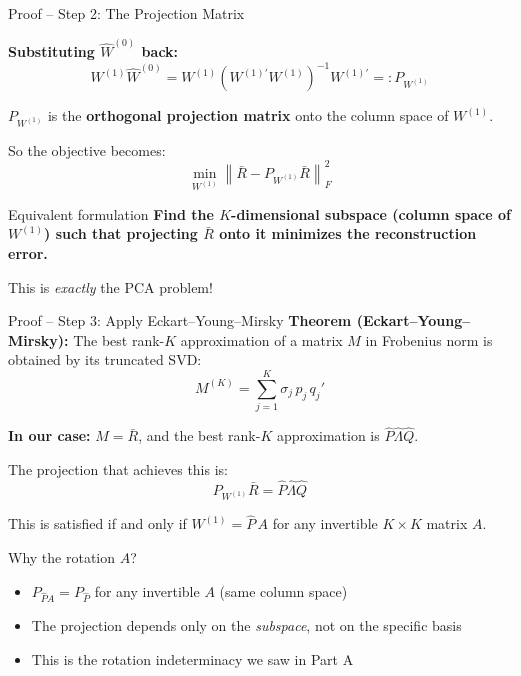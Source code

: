 \documentclass[aspectratio=169]{beamer}
\begin{document}
%
%
\begin{frame}{Proof -- Step 2: The Projection Matrix}

\textbf{Substituting $\hat{W}^{(0)}$ back:}
\[
W^{(1)}\hat{W}^{(0)} = W^{(1)}\left(W^{(1)\prime}W^{(1)}\right)^{-1}W^{(1)\prime} =: P_{W^{(1)}}
\]

$P_{W^{(1)}}$ is the \textbf{orthogonal projection matrix} onto the column space of $W^{(1)}$.

\vspace{0.5em}
So the objective becomes:
\[
\min_{W^{(1)}} \left\| \bar{R} - P_{W^{(1)}}\bar{R} \right\|_F^2
\]

\vspace{0.5em}
\begin{alertblock}{Equivalent formulation}
\textbf{Find the $K$-dimensional subspace (column space of $W^{(1)}$) such that projecting $\bar{R}$ onto it minimizes the reconstruction error.}
\end{alertblock}

This is \emph{exactly} the PCA problem!
\end{frame}
%
%
\begin{frame}{Proof -- Step 3: Apply Eckart--Young--Mirsky}
\small
\textbf{Theorem (Eckart--Young--Mirsky):} The best rank-$K$ approximation of a matrix $M$ in Frobenius norm is obtained by its truncated SVD:
\[
M^{(K)} = \sum_{j=1}^{K} \sigma_j\, p_j\, q_j'
\]

\vspace{0.3em}
\textbf{In our case:} $M = \bar{R}$, and the best rank-$K$ approximation is $\hat{P}\hat{\Lambda}\hat{Q}$.

\vspace{0.5em}
The projection that achieves this is:
\[
P_{W^{(1)}}\bar{R} = \hat{P}\hat{\Lambda}\hat{Q}
\]

This is satisfied if and only if $W^{(1)} = \hat{P}\,A$ for any invertible $K \times K$ matrix $A$.

\vspace{0.5em}
\begin{exampleblock}{Why the rotation $A$?}
\begin{itemize}
    \item $P_{\hat{P}A} = P_{\hat{P}}$ for any invertible $A$ (same column space)
    \item The projection depends only on the \emph{subspace}, not on the specific basis
    \item This is the rotation indeterminacy we saw in Part A
\end{itemize}
\end{exampleblock}
\end{frame}
\end{document}
